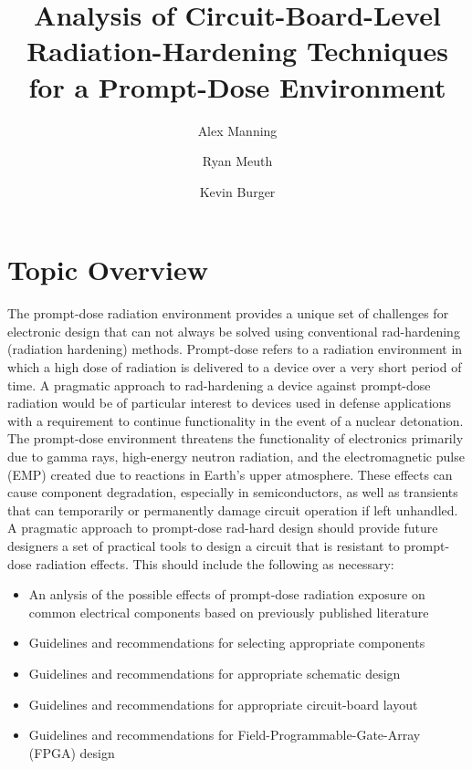 \documentclass{article}
\author{
    Alex Manning
    \and
    Ryan Meuth
    \and
    Kevin Burger
}
\title{Analysis of Circuit-Board-Level Radiation-Hardening Techniques for a Prompt-Dose Environment}
\begin{document}
\maketitle
\tableofcontents
\pagebreak

\section{Topic Overview}\label{Topic Overview}
    The prompt-dose radiation environment provides a unique set of challenges for electronic design that can not always be solved using conventional rad-hardening (radiation hardening)
    methods.  Prompt-dose refers to a radiation environment in which a high dose of radiation is delivered to a device over a very short period of time.  A pragmatic approach to rad-hardening a
    device against prompt-dose radiation would be of particular interest to devices used in  defense applications with a requirement to continue functionality in the event of a nuclear detonation.  The prompt-dose environment 
    threatens the functionality of electronics primarily due to gamma rays, high-energy neutron radiation, and the electromagnetic pulse (EMP) created due to reactions in Earth's upper atmosphere.
    These effects can cause component degradation, especially in semiconductors, as well as transients that can temporarily or permanently damage circuit operation if left unhandled.\\

    A pragmatic approach to prompt-dose rad-hard design should provide future designers a set of practical tools to design a circuit that is resistant to prompt-dose radiation effects.
    This should include the following as necessary:
    \begin{itemize}
        \item An anlysis of the possible effects of prompt-dose radiation exposure on common electrical components based on previously published literature
        \item Guidelines and recommendations for selecting appropriate components
        \item Guidelines and recommendations for appropriate schematic design
        \item Guidelines and recommendations for appropriate circuit-board layout
        \item Guidelines and recommendations for Field-Programmable-Gate-Array (FPGA) design
    \end{itemize}
\end{document}
